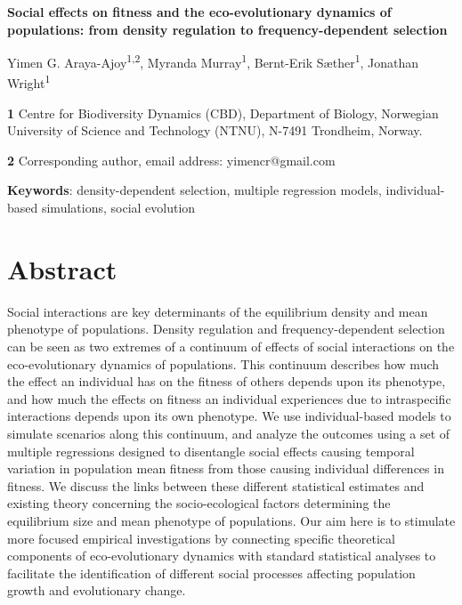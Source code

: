 \documentclass{article}
\begin{document}
\begin{center}
\large
\textbf{Social effects on fitness and the eco-evolutionary dynamics of populations: from density regulation to frequency-dependent selection}
\end{center}

\begin{center}
	Yimen G. Araya-Ajoy\textsuperscript{1,2}, Myranda Murray\textsuperscript{1},  Bernt-Erik Sæther\textsuperscript{1}, Jonathan Wright\textsuperscript{1}
\end{center}

\bigskip
\textbf{1} Centre for Biodiversity Dynamics (CBD), Department of Biology, Norwegian University of Science and Technology (NTNU), N-7491 Trondheim, Norway.

\bigskip
\textbf{2} Corresponding author, email address: yimencr@gmail.com

\bigskip
\textbf{Keywords}: density-dependent selection, multiple regression models, individual-based simulations, social evolution

\newpage
\section{Abstract}
Social interactions are key determinants of the equilibrium density and mean phenotype of populations. Density regulation and frequency-dependent selection can be seen as two extremes of a continuum of effects of social interactions on the eco-evolutionary dynamics of populations. This continuum  describes how much the effect an individual has on the fitness of others depends upon its phenotype, and how much the effects on fitness an individual experiences due to intraspecific interactions depends upon its own phenotype. We use individual-based models to simulate scenarios along this continuum, and analyze the outcomes using a set of multiple regressions designed to disentangle social effects causing temporal variation in population mean fitness from those causing individual differences in fitness. We discuss the links between these different statistical estimates and existing theory concerning the socio-ecological factors determining the equilibrium size and mean phenotype of populations. Our aim here is to stimulate more focused empirical investigations by connecting specific theoretical components of eco-evolutionary dynamics with standard statistical analyses to facilitate the identification of different social processes affecting population growth and evolutionary change. 
\end{document}
